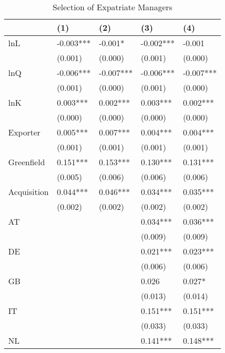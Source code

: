 \documentclass[12pt,a4paper]{article}
\begin{document}
\begin{table}
\caption{Selection of Expatriate Managers}
\label{table:selection}
\centering
\begin{tabular}{lllll} 
\hline
~               & (1)       & (2)       & (3)       & (4)        \\ 
\hline
lnL             & -0.003*** & -0.001*   & -0.002*** & -0.001     \\
~               & (0.001)   & (0.000)   & (0.001)   & (0.000)    \\
lnQ             & -0.006*** & -0.007*** & -0.006*** & -0.007***  \\
~               & (0.001)   & (0.000)   & (0.001)   & (0.000)    \\
lnK             & 0.003***  & 0.002***  & 0.003***  & 0.002***   \\
~               & (0.000)   & (0.000)   & (0.000)   & (0.000)    \\
Exporter        & 0.005***  & 0.007***  & 0.004***  & 0.004***   \\ 
\hline
~               & (0.001)   & (0.001)   & (0.001)   & (0.001)    \\
Greenfield      & 0.151***  & 0.153***  & 0.130***  & 0.131***   \\
~               & (0.005)   & (0.006)   & (0.006)   & (0.006)    \\
Acquisition     & 0.044***  & 0.046***  & 0.034***  & 0.035***   \\
~               & (0.002)   & (0.002)   & (0.002)   & (0.002)    \\ 
\hline
AT              & ~         & ~         & 0.034***  & 0.036***   \\
~               & ~         & ~         & (0.009)   & (0.009)    \\
DE              & ~         & ~         & 0.021***  & 0.023***   \\
~               & ~         & ~         & (0.006)   & (0.006)    \\
GB              & ~         & ~         & 0.026     & 0.027*     \\
~               & ~         & ~         & (0.013)   & (0.014)    \\
IT              & ~         & ~         & 0.151***  & 0.151***   \\
~               & ~         & ~         & (0.033)   & (0.033)    \\
NL              & ~         & ~         & 0.141***  & 0.148***   \\

\end{tabular}
\end{table}
\end{document}
